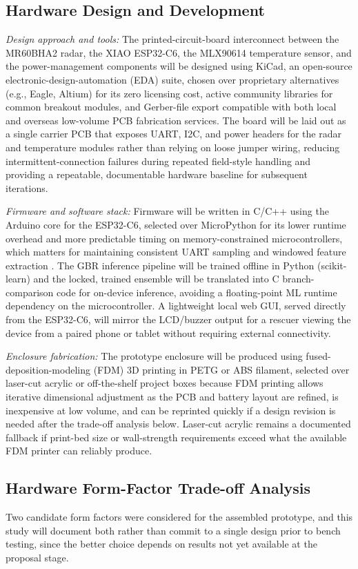 \documentclass[10pt,conference]{IEEEtran}
\begin{document}
\subsection{Hardware Design and Development}
\textit{Design approach and tools:} The printed-circuit-board interconnect between the MR60BHA2 radar, the XIAO ESP32-C6, the MLX90614 temperature sensor, and the power-management components will be designed using KiCad, an open-source electronic-design-automation (EDA) suite, chosen over proprietary alternatives (e.g., Eagle, Altium) for its zero licensing cost, active community libraries for common breakout modules, and Gerber-file export compatible with both local and overseas low-volume PCB fabrication services. The board will be laid out as a single carrier PCB that exposes UART, I2C, and power headers for the radar and temperature modules rather than relying on loose jumper wiring, reducing intermittent-connection failures during repeated field-style handling and providing a repeatable, documentable hardware baseline for subsequent iterations.

\textit{Firmware and software stack:} Firmware will be written in C/C++ using the Arduino core for the ESP32-C6, selected over MicroPython for its lower runtime overhead and more predictable timing on memory-constrained microcontrollers, which matters for maintaining consistent UART sampling and windowed feature extraction \cite{orsag2023}. The GBR inference pipeline will be trained offline in Python (scikit-learn) and the locked, trained ensemble will be translated into C branch-comparison code for on-device inference, avoiding a floating-point ML runtime dependency on the microcontroller. A lightweight local web GUI, served directly from the ESP32-C6, will mirror the LCD/buzzer output for a rescuer viewing the device from a paired phone or tablet without requiring external connectivity.

\textit{Enclosure fabrication:} The prototype enclosure will be produced using fused-deposition-modeling (FDM) 3D printing in PETG or ABS filament, selected over laser-cut acrylic or off-the-shelf project boxes because FDM printing allows iterative dimensional adjustment as the PCB and battery layout are refined, is inexpensive at low volume, and can be reprinted quickly if a design revision is needed after the trade-off analysis below. Laser-cut acrylic remains a documented fallback if print-bed size or wall-strength requirements exceed what the available FDM printer can reliably produce.

\subsection{Hardware Form-Factor Trade-off Analysis}
Two candidate form factors were considered for the assembled prototype, and this study will document both rather than commit to a single design prior to bench testing, since the better choice depends on results not yet available at the proposal stage.
\end{document}
